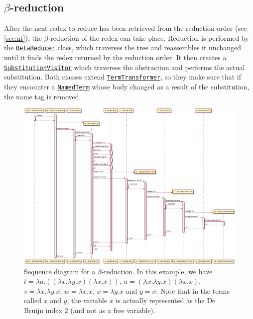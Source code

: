 \subsection{$\beta$-reduction}
After the next redex to reduce has been retrieved from the reduction order (see \ref{sec:nt}),
the $\beta$-reduction of the redex can take place. Reduction is performed by the
\texttt{\hyperref[type:edu.kit.wavelength.client.model.term.BetaReducer]{BetaReducer}}
class, which traverses the tree and reassembles it unchanged until it finds the
redex returned by the reduction order. It then creates a
\texttt{\hyperref[type:edu.kit.wavelength.client.model.term.SubstitutionVisitor]{SubstitutionVisitor}}
which traverses the abstraction and performs the actual substitution. Both classes
extend \texttt{\hyperref[type:edu.kit.wavelength.client.model.term.TermTransformer]{TermTransformer}},
so they make sure that if they encounter a \texttt{\hyperref[type:edu.kit.wavelength.client.model.term.NamedTerm]{NamedTerm}}
whose body changed as a result of the substitution, the name tag is removed.


\begin{figure}[H]
	\centering
	\includegraphics[width=\textwidth]{sequenceDiagrams/betaReduction}
	\caption{Sequence diagram for a $\beta$-reduction. In this example, we have $t = \lambda a.((\lambda x.\lambda y.x)(\lambda x.x))$,
		$u = (\lambda x.\lambda y.x)(\lambda x.x)$, $v = \lambda x.\lambda y.x$,
		$w = \lambda x.x$, $x = \lambda y.x$ and $y = x$. Note that in the terms called
		$x$ and $y$, the variable $x$ is actually represented as the De Bruijn index $2$
		(and not as a free variable).}
\end{figure}

